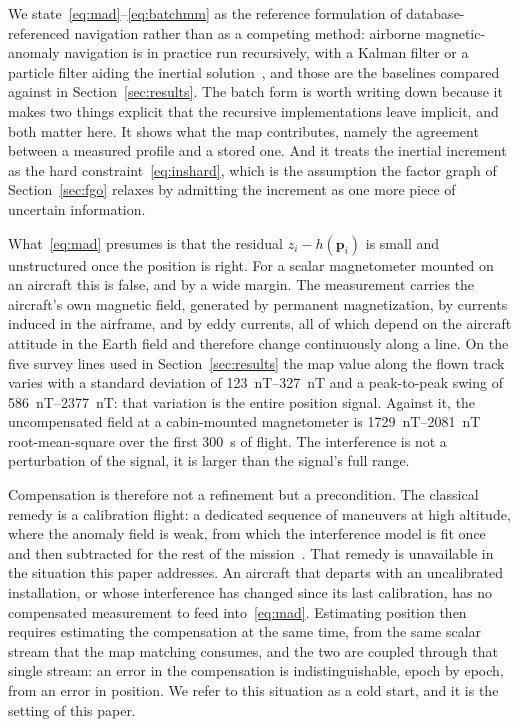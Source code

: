 We state~\eqref{eq:mad}--\eqref{eq:batchmm} as the reference formulation of
database-referenced navigation rather than as a competing method: airborne
magnetic-anomaly navigation is in practice run recursively, with a Kalman filter
or a particle filter aiding the inertial
solution~\cite{canciani2017,gnadt2022}, and those are the baselines compared
against in Section~\ref{sec:results}. The batch form is worth writing down
because it makes two things explicit that the recursive implementations leave
implicit, and both matter here. It shows what the map contributes, namely the
agreement between a measured profile and a stored one. And it treats the
inertial increment as the hard constraint~\eqref{eq:inshard}, which is the
assumption the factor graph of Section~\ref{sec:fgo} relaxes by admitting the
increment as one more piece of uncertain information.

What~\eqref{eq:mad} presumes is that the residual $z_i-h(\mathbf{p}_i)$ is small
and unstructured once the position is right. For a scalar magnetometer mounted
on an aircraft this is false, and by a wide margin. The measurement carries the
aircraft's own magnetic field, generated by permanent magnetization, by
currents induced in the airframe, and by eddy currents, all of which depend on
the aircraft attitude in the Earth field and therefore change continuously along
a line. On the five survey lines used in Section~\ref{sec:results} the map value
along the flown track varies with a standard deviation of
\SIrange{123}{327}{\nano\tesla} and a peak-to-peak swing of
\SIrange{586}{2377}{\nano\tesla}: that variation is the entire position signal.
Against it, the uncompensated field at a cabin-mounted magnetometer is
\SIrange{1729}{2081}{\nano\tesla} root-mean-square over the first
\SI{300}{\second} of flight. The interference is not a perturbation of the
signal, it is larger than the signal's full range.

Compensation is therefore not a refinement but a precondition. The classical
remedy is a calibration flight: a dedicated sequence of maneuvers at high
altitude, where the anomaly field is weak, from which the interference model is
fit once and then subtracted for the rest of the
mission~\cite{tolles1950,leliak1961,bickel1979}. That remedy is unavailable in
the situation this paper addresses. An aircraft that departs with an
uncalibrated installation, or whose interference has changed since its last
calibration, has no compensated measurement to feed
into~\eqref{eq:mad}. Estimating position then requires estimating the
compensation at the same time, from the same scalar stream that the map
matching consumes, and the two are coupled through that single stream: an error
in the compensation is indistinguishable, epoch by epoch, from an error in
position. We refer to this situation as a cold start, and it is the setting of
this paper.

